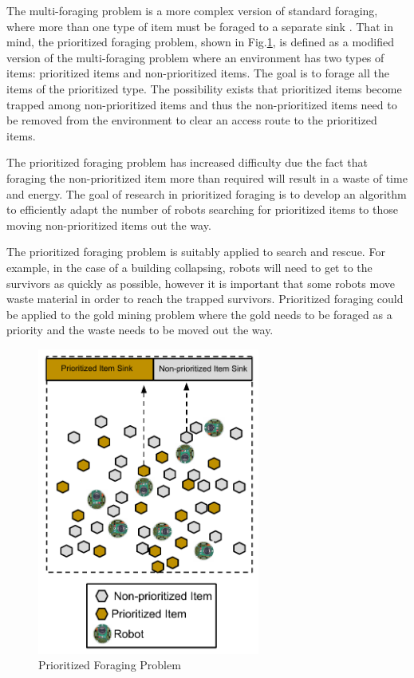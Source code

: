 
The multi-foraging problem is a more complex version of standard foraging, where more than one type of item must be foraged to a separate sink \cite{balch1999impact}. That in mind, the prioritized foraging problem, shown in Fig.\ref{prioritizedforaging}, is defined as a modified version of the multi-foraging problem where an environment has two types of items: prioritized items and non-prioritized items. The goal is to forage all the items of the prioritized type. The possibility exists that prioritized items become trapped among non-prioritized items and thus the non-prioritized items need to be removed from the environment to clear an access route to the prioritized items. 

The prioritized foraging problem has increased difficulty due the fact that  foraging the non-prioritized item more than required will result in a waste of time and energy. The goal of research in prioritized foraging is to develop an algorithm to efficiently adapt the number of robots searching for prioritized items to those moving non-prioritized items out the way. 

The prioritized foraging problem is suitably applied to search and rescue. For example, in the case of a building collapsing, robots will need to get to the survivors as quickly as possible, however it is important that some robots move waste material in order to reach the trapped survivors. Prioritized foraging could be applied to the gold mining problem where the gold needs to be foraged as a priority and the waste needs to be moved out the way.


\begin{figure} [h]
	\centering
	\includegraphics[width=0.65\textwidth]{chapters/chapter2/figures/EpuckGoldMining.pdf}
	\caption{Prioritized Foraging Problem }
	\label{prioritizedforaging}
\end{figure}

